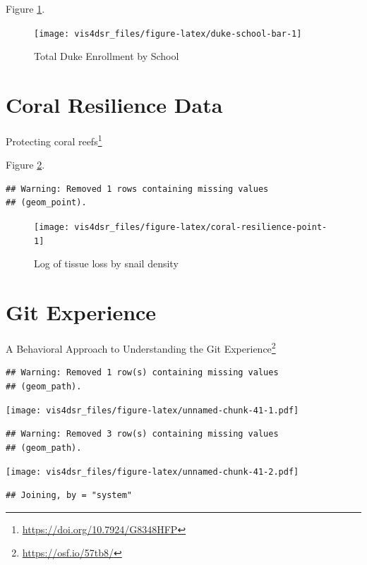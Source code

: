 \documentclass[
]{krantz}
\renewcommand{\href}[2]{#2\footnote{\url{#1}}}
\begin{document}
Figure \ref{fig:duke-school-bar}.

\begin{figure}
\texttt{[image: vis4dsr\_files/figure-latex/duke-school-bar-1]} \caption{Total Duke Enrollment by School}\label{fig:duke-school-bar}
\end{figure}

\hypertarget{coral-resilience-data}{%
\section*{Coral Resilience Data}\label{coral-resilience-data}}


\href{https://doi.org/10.7924/G8348HFP}{Protecting coral reefs}

Figure \ref{fig:coral-resilience-point}.

\begin{verbatim}
## Warning: Removed 1 rows containing missing values
## (geom_point).
\end{verbatim}

\begin{figure}
\texttt{[image: vis4dsr\_files/figure-latex/coral-resilience-point-1]} \caption{Log of tissue loss by snail density}\label{fig:coral-resilience-point}
\end{figure}

\hypertarget{git-experience}{%
\section*{Git Experience}\label{git-experience}}


\href{https://osf.io/57tb8/}{A Behavioral Approach to Understanding the Git Experience}

\begin{verbatim}
## Warning: Removed 1 row(s) containing missing values
## (geom_path).
\end{verbatim}

\texttt{[image: vis4dsr\_files/figure-latex/unnamed-chunk-41-1.pdf]}

\begin{verbatim}
## Warning: Removed 3 row(s) containing missing values
## (geom_path).
\end{verbatim}

\texttt{[image: vis4dsr\_files/figure-latex/unnamed-chunk-41-2.pdf]}

\begin{verbatim}
## Joining, by = "system"
\end{verbatim}
\end{document}
